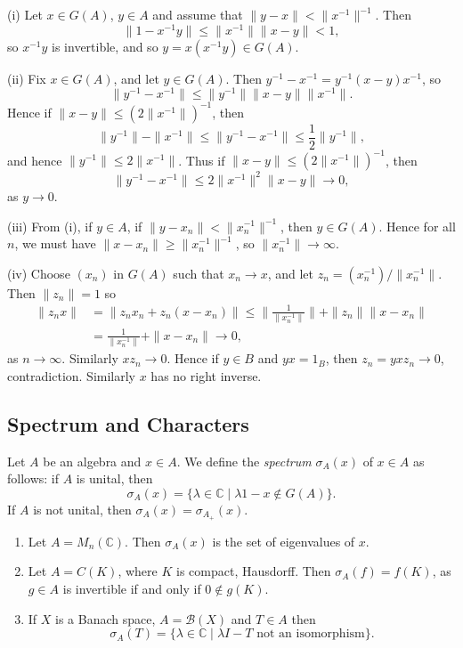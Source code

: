 \documentclass[12pt]{article}
\begin{document}
\begin{proofbox}
	

	(i) Let $x \in G(A)$, $y \in A$ and assume that $\|y - x\| < \|x^{-1}\|^{-1}$. Then
	\[
	\|1 - x^{-1}y\| \leq \|x^{-1}\| \|x - y\| < 1,
	\]
	so $x^{-1} y$ is invertible, and so $y = x(x^{-1} y) \in G(A)$.

	(ii) Fix $x \in G(A)$, and let $y \in G(A)$. Then $y^{-1} - x^{-1} = y^{-1}(x - y)x^{-1}$, so
	\[
	\|y^{-1} - x^{-1}\| \leq \|y^{-1}\| \|x-y\| \|x^{-1}\|.
	\]
	Hence if $\|x - y\| \leq (2 \|x^{-1}\|)^{-1}$, then
	\[
	\|y^{-1}\| - \|x^{-1}\| \leq \|y^{-1} - x^{-1}\| \leq \frac{1}{2} \|y^{-1}\|,
	\]
	and hence $\|y^{-1}\| \leq 2 \|x^{-1}\|$. Thus if $\|x - y\| \leq (2 \|x^{-1}\|)^{-1}$, then
	\[
	\|y^{-1} - x^{-1}\| \leq 2 \|x^{-1}\|^2 \|x - y\| \to 0,
	\]
	as $y \to 0$.

	(iii) From (i), if $y \in A$, if $\|y - x_n\| < \|x_n^{-1}\|^{-1}$, then $y \in G(A)$. Hence for all $n$, we must have $\|x - x_n\| \geq \|x_n^{-1}\|^{-1}$, so $\|x_n^{-1}\| \to \infty$.

	(iv) Choose $(x_n)$ in $G(A)$ such that $x_n \to x$, and let $z_n = (x_n^{-1}) / \|x_n^{-1}\|$. Then $\|z_n\| = 1$ so
	\begin{align*}
		\|z_n x\| &= \|z_n x_n + z_n(x  - x_n)\| \leq \biggl\| \frac{1}{\|x_n^{-1}\|}\biggr\| + \|z_n\| \|x - x_n\| \\
			  &= \frac{1}{\|x_n^{-1}\|} + \|x - x_n\| \to 0,
	\end{align*}
	as $n \to \infty$. Similarly $x z_n \to 0$. Hence if $y \in B$ and $yx = 1_B$, then $z_n = yx z_n \to 0$, contradiction. Similarly $x$ has no right inverse.
\end{proofbox}

\subsection{Spectrum and Characters}%
\label{sub:spec_char}

\begin{definition}
	Let $A$ be an algebra and $x \in A$. We define the \emph{spectrum} $\sigma_A(x)$ of $x \in A$ as follows: if $A$ is unital, then
	\[
		\sigma_A(x) = \{\lambda \in \mathbb{C} \mid \lambda 1 - x \not \in G(A)\}.
	\]
	If $A$ is not unital, then $\sigma_A(x) = \sigma_{A_+}(x)$.
\end{definition}

\begin{exbox}
	\begin{enumerate}
		\item Let $A = M_n(\mathbb{C})$. Then $\sigma_A(x)$ is the set of eigenvalues of $x$.
		\item Let $A = C(K)$, where $K$ is compact, Hausdorff. Then $\sigma_A(f) = f(K)$, as $g \in A$ is invertible if and only if $0 \not \in g(K)$.
		\item If $X$ is a Banach space, $A = \mathcal{B}(X)$ and $T \in A$ then
			\[
				\sigma_A(T) = \{\lambda \in \mathbb{C} \mid \lambda I - T \text{ not an isomorphism}\}.
			\]
	\end{enumerate}
\end{exbox}
\end{document}
